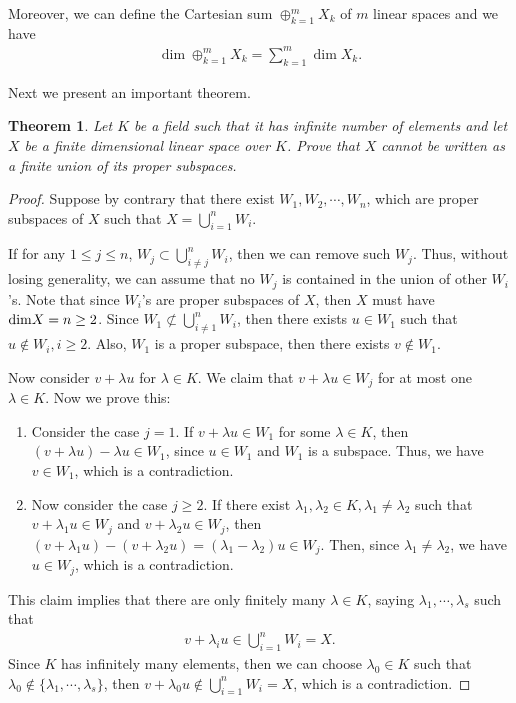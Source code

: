 \documentclass[10pt]{book}
\newtheorem{theorem}{Theorem}[chapter]
\theoremstyle{definition}
\numberwithin{equation}{chapter}
\begin{document}
Moreover, we can define the Cartesian sum $\oplus^m_{k=1}X_k$ of $m$ linear spaces and we have 
\begin{align*}
    \dim \oplus^m_{k=1}X_k = \sum^m_{k=1}\dim X_k.
\end{align*}

\medskip

Next we present an important theorem.

\medskip

\begin{theorem}
Let $K$ be a field such that it has infinite number of elements and let $X$ be a finite dimensional linear space over $K$. Prove that $X$ cannot be written as a finite union of its proper subspaces.
\end{theorem}
\begin{proof}
Suppose by contrary that there exist $W_1, W_2,\cdots, W_n$, which are proper subspaces of $X$ such that $X = \bigcup^n_{i=1}W_i$. 

If for any $1\leq j\leq n$, $W_j\subset \bigcup^n_{i\neq j}W_i$, then we can remove such $W_j$. Thus, without losing generality, we can assume that no $W_j$ is contained in the union of other $W_i$'s. Note that since $W_i$'s are proper subspaces of $X$, then $X$ must have ${\rm dim}X = n \geq 2$. Since $W_1\not\subset \bigcup^n_{i\neq 1}W_i$, then there exists $u\in W_1$ such that $u\notin W_i, i\geq 2$. Also, $W_1$ is a proper subspace, then there exists $v\notin W_1$. 

Now consider $v + \lambda u$ for $\lambda\in K$. We claim that $v + \lambda u\in W_j$ for at most one $\lambda\in K$. Now we prove this:
\begin{enumerate}[label=(\alph*)]
    \item Consider the case $j=1$. If $v + \lambda u\in W_1$ for some $\lambda\in K$, then $(v + \lambda u) - \lambda u\in W_1$, since $u\in W_1$ and $W_1$ is a subspace. Thus, we have $v\in W_1$, which is a contradiction.
    \item Now consider the case $j\geq 2$. If there exist $\lambda_1, \lambda_2\in K, \lambda_1\neq\lambda_2$ such that $v+\lambda_1 u\in W_j$ and $v+\lambda_2 u\in W_j$, then $(v+\lambda_1 u) - (v+\lambda_2 u) = (\lambda_1 - \lambda_2)u \in W_j$. Then, since $\lambda_1\neq\lambda_2$, we have $u\in W_j$, which is a contradiction.
\end{enumerate}

This claim implies that there are only finitely many $\lambda\in K$, saying $\lambda_1, \cdots, \lambda_s$ such that 
\begin{align*}
    v+\lambda_i u \in \bigcup^n_{i=1}W_i = X.
\end{align*}
Since $K$ has infinitely many elements, then we can choose $\lambda_0\in K$ such that $\lambda_0\notin \{\lambda_1, \cdots, \lambda_s\}$, then $v+\lambda_0 u\notin \bigcup^n_{i=1}W_i = X$, which is a contradiction.
\end{proof}
\end{document}
